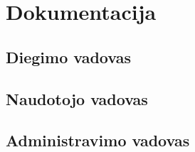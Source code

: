 \section{Dokumentacija}
\subsection{Diegimo vadovas}
\subsection{Naudotojo vadovas}
\subsection{Administravimo vadovas}
